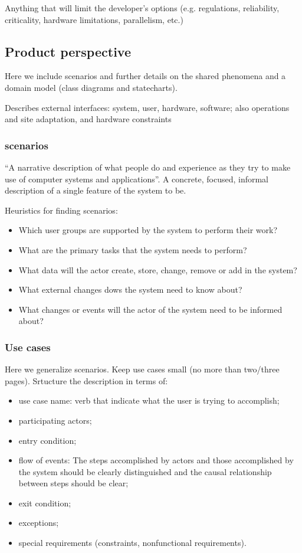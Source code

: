 Anything that will limit the developer’s options (e.g. regulations, reliability, criticality, hardware limitations, parallelism, etc.)


\subsection{Product perspective}
\label{subsect:productperspective}

Here we include scenarios and further details on the shared phenomena and a domain model (class diagrams and statecharts).

Describes external interfaces: system, user, hardware, software; also operations and site adaptation, and hardware constraints

\subsubsection{scenarios}
\label{subsubsect:scenarios}

“A narrative description of what people do and experience as they try to make use of computer systems and applications”.
A concrete, focused, informal description of a single feature of the system to be.

Heuristics for finding scenarios:
\begin{itemize}
    \item Which user groups are supported by the system to perform their work?
    \item What are the primary tasks that the system needs to perform?
    \item What data will the actor create, store, change, remove or add in the system?
    \item What external changes dows the system need to know about?
    \item What changes or events will the actor of the system need to be informed about?
\end{itemize}

\subsubsection{Use cases}
\label{subsubsect:usecases}

Here we generalize scenarios. Keep use cases small (no more than two/three pages).
Srtucture the description in terms of:
\begin{itemize}
    \item use case name: verb that indicate what the user is trying     to accomplish;
    \item participating actors;
    \item entry condition;
    \item flow of events: The steps accomplished by actors and those accomplished by the system should be clearly distinguished and the causal relationship between steps should be clear;
    \item exit condition;
    \item exceptions;
    \item special requirements (constraints, nonfunctional requirements).
\end{itemize}

